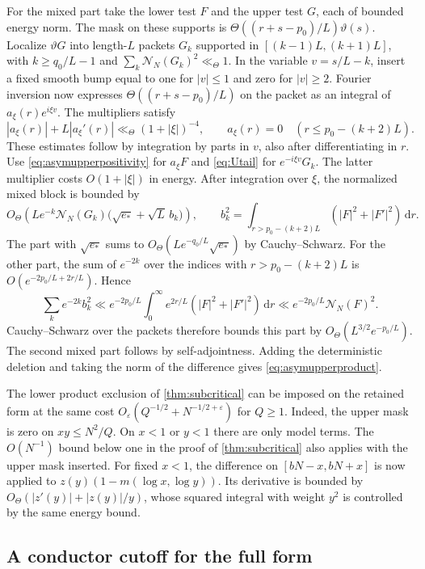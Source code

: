 \documentclass[11pt,a4paper]{article}
\numberwithin{equation}{section}
\newcommand{\ud}{\mathrm d}
\newcommand{\NN}{\mathcal N_N}
\begin{document}
For the mixed part take the lower test $F$ and the upper
test $G$, each of bounded energy norm. The mask on these
supports is $\Theta((r+s-p_0)/L)\vartheta(s)$. Localize
$\vartheta G$ into length-$L$ packets $G_k$ supported in
$[(k-1)L,(k+1)L]$, with $k\ge q_0/L-1$ and
$\sum_k\NN(G_k)^2\ll_\Theta1$.
In the variable $v=s/L-k$, insert a fixed smooth bump
equal to one for $|v|\le1$ and zero for $|v|\ge2$. Fourier
inversion now expresses $\Theta((r+s-p_0)/L)$ on the packet
as an integral of $a_\xi(r)e^{i\xi v}$. The multipliers satisfy
\[
 |a_\xi(r)|+L|a_\xi'(r)|\ll_\Theta (1+|\xi|)^{-4},
 \qquad a_\xi(r)=0\quad (r\le p_0-(k+2)L).
\]
These estimates follow by integration by parts in $v$,
also after differentiating in $r$.
Use \cref{eq:asymupperpositivity} for $a_\xi F$ and
\cref{eq:Utail} for $e^{-i\xi v}G_k$. The latter multiplier
costs $O(1+|\xi|)$ in energy. After integration over $\xi$,
the normalized mixed block is bounded by
\[
 O_\Theta\!\left(L e^{-k}\NN(G_k)
       \bigl(\sqrt{e_*}+\sqrt L\,b_k\bigr)\right),
 \qquad
 b_k^2=\int_{r>p_0-(k+2)L} (|F|^2+|F'|^2)\,\ud r.
\]
The part with $\sqrt{e_*}$ sums to
$O_\Theta(L e^{-q_0/L}\sqrt{e_*})$ by Cauchy--Schwarz.
For the other part, the sum of $e^{-2k}$ over the
indices with $r>p_0-(k+2)L$ is
$O(e^{-2p_0/L+2r/L})$. Hence
\[
 \sum_k e^{-2k}b_k^2
 \ll e^{-2p_0/L}\int_0^\infty e^{2r/L}
                 (|F|^2+|F'|^2)\,\ud r
 \ll e^{-2p_0/L}\NN(F)^2.
\]
Cauchy--Schwarz over the packets therefore bounds this part
by $O_\Theta(L^{3/2}e^{-p_0/L})$. The second mixed part follows
by self-adjointness. Adding the deterministic deletion and
taking the norm of the difference gives
\cref{eq:asymupperproduct}.

The lower product exclusion of \cref{thm:subcritical} can be
imposed on the retained form at the same cost
$O_\varepsilon(Q^{-1/2}+N^{-1/2+\varepsilon})$ for $Q\ge1$.
Indeed, the upper mask is zero on $xy\le N^2/Q$. On $x<1$
or $y<1$ there are only model terms. The $O(N^{-1})$ bound
below one in the proof of \cref{thm:subcritical} also applies
with the upper mask inserted. For fixed $x<1$, the difference
on $[bN-x,bN+x]$ is now applied to
$z(y)(1-m(\log x,\log y))$. Its derivative is bounded by
$O_\Theta(|z'(y)|+|z(y)|/y)$, whose squared integral with
weight $y^2$ is controlled by the same energy bound.

\subsection{A conductor cutoff for the full form}
\end{document}
